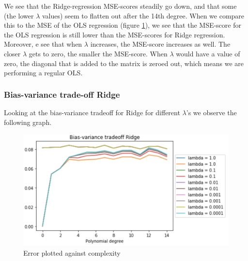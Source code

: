 \documentclass[12pt]{extarticle}
\begin{document}
We see that the Ridge-regression MSE-scores steadily go down, and that some (the lower $\lambda$ values) seem to flatten out after the 14th degree. When we compare this to the MSE of the OLS regression (figure \ref{fig:f8}), we see that the MSE-score for the OLS regression is still lower than the MSE-scores for Ridge regression. Moreover, e see that when $\lambda$ increases, the MSE-score increases as well. The closer $\lambda$ gets to zero, the smaller the MSE-score. When $\lambda$ would have a value of zero, the diagonal that is added to the matrix is zeroed out, which means we are performing a regular OLS. 
\subsubsection{Bias-variance trade-off Ridge}

Looking at the bias-variance tradeoff for Ridge for different $\lambda$'s we observe the following graph.

\begin{figure}
    \centering
    \includegraphics[width=.8\linewidth]{9}
    \caption{Error plotted against complexity}
    \label{fig:f8}
\end{figure}
\end{document}
